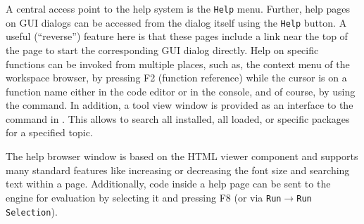 A central access point to the help system is the \texttt{Help} menu. Further, help pages on
 GUI dialogs can be accessed from the dialog itself using the
\texttt{Help} button. A useful (``reverse'') feature here is that these pages include 
a link near the top of the page to start the corresponding GUI dialog directly.
Help on  specific functions can be invoked from multiple places, 
such as, the context menu of the workspace browser, by pressing F2 (function
reference) while the cursor is on a function name either in the code editor or 
in the  console, and of course, by using the  
command. In addition, a tool view window is provided as an interface to the
 command in . This allows to search all installed, 
all loaded, or specific  packages for a specified topic.

The help browser window is based on the 
HTML viewer component and supports many standard
features like increasing or decreasing the font size and searching text
within a page. Additionally,  code inside a help
page can be sent to the  engine for
evaluation by selecting it and pressing F8 (or via \texttt{Run$\rightarrow$Run
Selection}).
